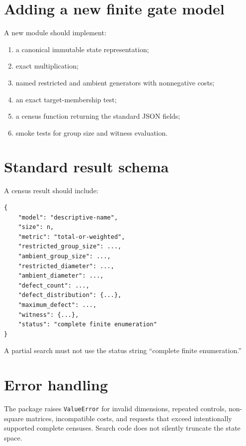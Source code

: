 \section{Adding a new finite gate model}
A new module should implement:
\begin{enumerate}
\item a canonical immutable state representation;
\item exact multiplication;
\item named restricted and ambient generators with nonnegative costs;
\item an exact target-membership test;
\item a census function returning the standard JSON fields;
\item smoke tests for group size and witness evaluation.
\end{enumerate}

\section{Standard result schema}
A census result should include:
\begin{lstlisting}[style=pythonstyle]
{
    "model": "descriptive-name",
    "size": n,
    "metric": "total-or-weighted",
    "restricted_group_size": ...,
    "ambient_group_size": ...,
    "restricted_diameter": ...,
    "ambient_diameter": ...,
    "defect_count": ...,
    "defect_distribution": {...},
    "maximum_defect": ...,
    "witness": {...},
    "status": "complete finite enumeration"
}
\end{lstlisting}
A partial search must not use the status string ``complete finite enumeration.''

\section{Error handling}
The package raises \texttt{ValueError} for invalid dimensions, repeated controls, non-square matrices, incompatible costs, and requests that exceed intentionally supported complete censuses.  Search code does not silently truncate the state space.
